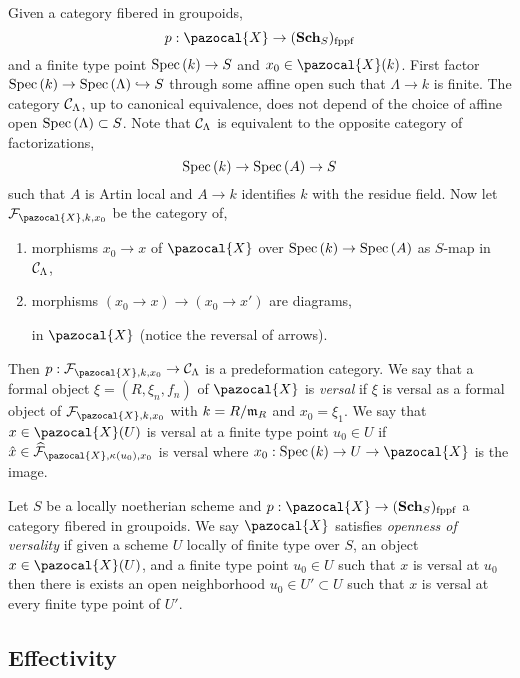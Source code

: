 \documentclass[12pt]{article}
\renewcommand{\X}{\pazocal{X}}
\renewcommand{\F}{\mathcal{F}}
\begin{document}
\begin{defn}
Given a category fibered in groupoids,
\[ p : \X \to (\Sch_S)_{\fppf} \]
and a finite type point $\mathrm{Spec}\left( k \right) \to S$ and $x_0 \in \X(k)$. First factor $\mathrm{Spec}\left( k \right) \to \mathrm{Spec}\left( \Lambda \right) \hookrightarrow S$ through some affine open such that $\Lambda \to k$ is finite. The category $\mathcal{C}_\Lambda$, up to canonical equivalence, does not depend of the choice of affine open $\mathrm{Spec}\left( \Lambda \right) \subset S$. Note that $\mathcal{C}_{\Lambda}$ is equivalent to the opposite category of factorizations,
\[ \mathrm{Spec}\left( k \right) \to \mathrm{Spec}\left( A \right) \to S \]
such that $A$ is Artin local and $A \to k$ identifies $k$ with the residue field. Now let $\F_{\X, k, x_0}$ be the category of,
\begin{enumerate}
\item morphisms $x_0 \to x$ of $\X$ over $\mathrm{Spec}\left( k \right) \to \mathrm{Spec}\left( A \right)$ as $S$-map in $\mathcal{C}_{\Lambda}$,
\item morphisms $(x_0 \to x) \to (x_0 \to x')$ are diagrams,
\begin{center}
\end{center}
in $\X$ (notice the reversal of arrows). 
\end{enumerate}
Then $p : \F_{\X, k, x_0} \to \C_{\Lambda}$ is a predeformation category. We say that a formal object $\xi = (R, \xi_n, f_n)$ of $\X$ is \textit{versal} if $\xi$ is versal as a formal object of $\F_{\X, k, x_0}$ with $k = R / \mathfrak{m}_R$ and $x_0 = \xi_1$. We say that $x \in \X(U)$ is versal at a finite type point $u_0 \in U$ if $\hat{x} \in \wh{\F}_{\X, \kappa(u_0), x_0}$ is versal where $x_0 : \Spec{k} \to U \to \X$ is the image. 
\end{defn}

\begin{defn}
Let $S$ be a locally noetherian scheme and $p : \X \to (\Sch_S)_{\fppf}$ a category fibered in groupoids. We say $\X$ satisfies \textit{openness of versality} if given a scheme $U$ locally of finite type over $S$, an object $x \in \X(U)$, and a finite type point $u_0 \in U$ such that $x$ is versal at $u_0$ then there is exists an open neighborhood $u_0 \in U' \subset U$ such that $x$ is versal at every finite type point of $U'$.
\end{defn}

\subsection{Effectivity}
\end{document}
